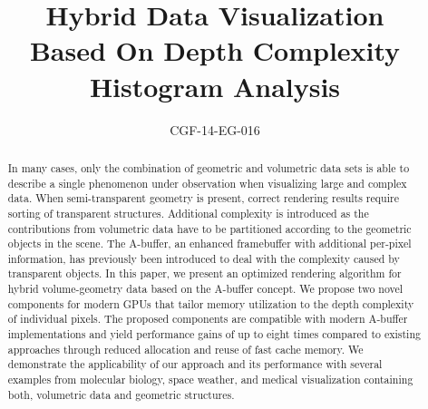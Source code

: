 \documentclass{egpubl}
\title[Hybrid Data Visualization]%
      {Hybrid Data Visualization\\ Based On Depth Complexity Histogram Analysis}
\author[CGF-14-EG-016]
       {CGF-14-EG-016}
\newcommand{\yellow}[1]{{\color{Goldenrod}#1}}
\newcommand{\green}[1]{{\color{PineGreen}#1}}
\newcommand{\minor}[1]{\yellow{#1}}
\newcommand{\new}[1]{\green{#1}}
\newcommand{\ab}{\mbox{A-buffer}}
\newlength{\imgWidth}
\newif\ifSplitBoxFramed
\newcommand{\splitImage}[2]{%
  \begin{tikzpicture}[x=\imgWidth,y=-\imgWidth] %
    \clip (0,0) rectangle (1,1);
    \begin{scope}[]
      \clip (0,0) -- (\topLineRatio,0) -- (\bottomLineRatio,1) -- (0,1);
      \draw(0,0) node[anchor=north west,inner sep=0pt]{%
        \texttt{[image: \#1]}};
    \end{scope}
    \begin{scope}[]
      \clip  (\topLineRatio,0) -- (\bottomLineRatio,1) -- (1,1) -- (1,0);
      \draw(0,0) node[anchor=north west,inner sep=0pt]{%
        \texttt{[image: \#2]}};
    \end{scope}
    \draw[black,very thick] (\topLineRatio,0) -- (\bottomLineRatio,1) ;
    \ifSplitBoxFramed%
      \draw[line width=1pt] (0,0) rectangle (1,1);
    \fi
  \end{tikzpicture}
}
\newcommand{\goldenRatioLong}{0.618}
\newcommand{\goldenRatioShort}{0.382}
\newcommand{\setSplitLineRatios}[2]{%
  \def\topLineRatio{#1}
  \def\bottomLineRatio{#2}
}
\begin{document}
\setSplitLineRatios{\goldenRatioLong}{\goldenRatioShort}


\maketitle

\begin{abstract}
%
In many cases, only the combination of geometric and volumetric data sets is able to describe a single phenomenon under observation when visualizing large and complex data.
When semi-transparent geometry is present, correct rendering results require sorting of transparent structures. 
Additional complexity is introduced as the contributions from volumetric data have to be partitioned according to the geometric objects in the scene.
The \ab{}, an enhanced framebuffer with additional per-pixel information, has previously been introduced to deal with the complexity caused by transparent objects. 
In this paper, we present an optimized rendering algorithm for hybrid volume-geometry data based on the \ab{} concept. 
We propose two novel components for modern GPUs that \minor{tailor} memory utilization to the depth complexity of individual pixels.
The proposed components are compatible with modern \ab{} implementations and yield performance gains of up to eight times compared to existing approaches \new{through reduced allocation and reuse of fast cache memory}. 
%
We demonstrate the applicability of our approach and its performance with several examples from molecular biology, space weather, and medical visualization containing both, volumetric data and geometric structures.

\begin{classification} %
\end{classification}

\end{abstract}
\end{document}
